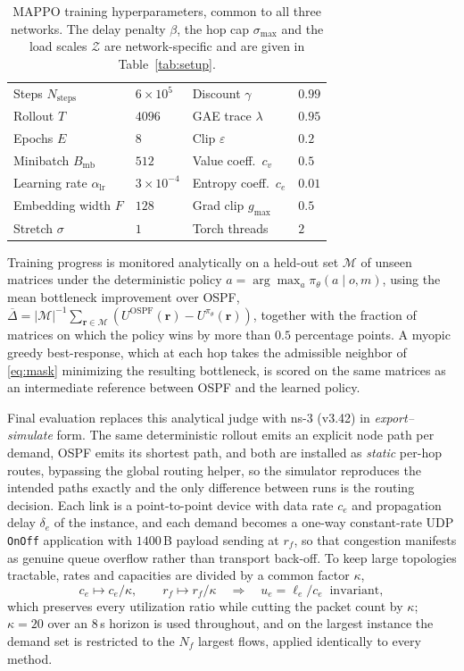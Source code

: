\begin{table}[h]
\centering
\begin{tabular}{llll}
\hline
Steps $N_{\mathrm{steps}}$ & $6\times10^{5}$ & Discount $\gamma$ & $0.99$ \\
Rollout $T$ & $4096$ & GAE trace $\lambda$ & $0.95$ \\
Epochs $E$ & $8$ & Clip $\varepsilon$ & $0.2$ \\
Minibatch $B_{\mathrm{mb}}$ & $512$ & Value coeff.\ $c_v$ & $0.5$ \\
Learning rate $\alpha_{\mathrm{lr}}$ & $3\times10^{-4}$ & Entropy coeff.\ $c_e$ & $0.01$ \\
Embedding width $F$ & $128$ & Grad clip $g_{\max}$ & $0.5$ \\
Stretch $\sigma$ & $1$ & Torch threads & $2$ \\
\hline
\end{tabular}
\caption{MAPPO training hyperparameters, common to all three networks. The
delay penalty $\beta$, the hop cap $\sigma_{\max}$ and the load scales
$\mathcal{Z}$ are network-specific and are given in Table~\ref{tab:setup}.}
\label{tab:hyperparams}
\end{table}

Training progress is monitored analytically on a held-out set $\mathcal{M}$ of unseen matrices
under the deterministic policy $a = \arg\max_a \pi_\theta(a\mid o,m)$, using the mean
bottleneck improvement over OSPF,
$\overline{\Delta} = |\mathcal{M}|^{-1}\sum_{\mathbf{r}\in\mathcal{M}}
(U^{\mathrm{OSPF}}(\mathbf{r}) - U^{\pi_\theta}(\mathbf{r}))$, together with the
fraction of matrices on which the policy wins by more than $0.5$ percentage points. A myopic
greedy best-response, which at each hop takes the admissible neighbor of \eqref{eq:mask}
minimizing the resulting bottleneck, is scored on the same matrices as an intermediate reference
between OSPF and the learned policy.

Final evaluation replaces this analytical judge with \mbox{ns-3} (v3.42) in
\emph{export--simulate} form. The same deterministic rollout emits an explicit node path per
demand, OSPF emits its shortest path, and both are installed as \emph{static} per-hop routes,
bypassing the global routing helper, so the simulator reproduces the intended paths exactly and
the only difference between runs is the routing decision. Each link is a point-to-point device
with data rate $c_e$ and propagation delay $\delta_e$ of the instance, and each demand becomes a
one-way constant-rate UDP \texttt{OnOff} application with $1400$\,B payload sending at $r_f$, so that
congestion manifests as genuine queue overflow rather than transport back-off. To keep large
topologies tractable, rates and capacities are divided by a common factor $\kappa$,
\begin{equation}\label{eq:scale}
c_e \mapsto c_e/\kappa, \qquad r_f \mapsto r_f/\kappa
\quad\Longrightarrow\quad
u_e = \ell_e/c_e \;\; \text{invariant},
\end{equation}
which preserves every utilization ratio while cutting the packet count by $\kappa$; $\kappa = 20$
over an $8$\,s horizon is used throughout, and on the largest instance the demand set is
restricted to the $N_f$ largest flows, applied identically to every method.

